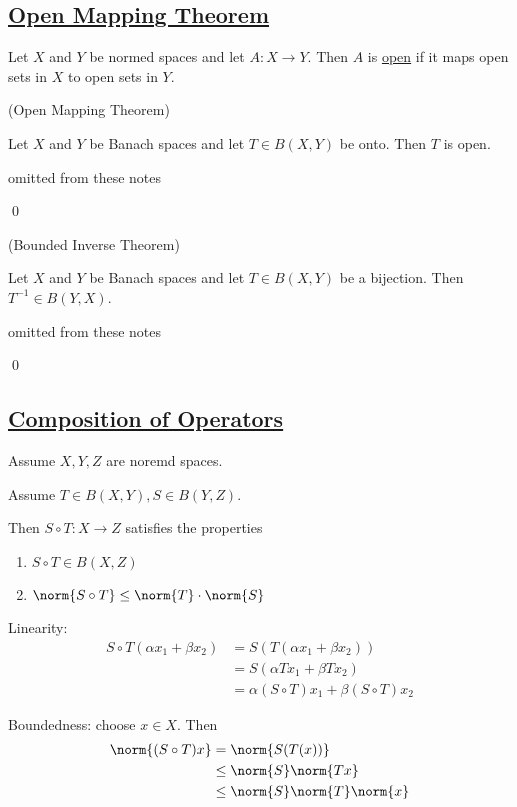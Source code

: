 \documentclass[x11names,reqno,14pt]{extarticle}
\begin{document}
\subsection*{\underline{Open Mapping Theorem}}


Let $X$ and $Y$ be normed spaces and let $A:X\to Y$. Then $A$ is \underline{open} if it maps open sets in $X$ to open sets in $Y$. 

\thm (Open Mapping Theorem)

Let $X$ and $Y$ be Banach spaces and let $T \in B(X, Y)$ be onto. Then $T$ is open. 

\proof 

omitted from these notes

\qed

\thm (Bounded Inverse Theorem)

Let $X$ and $Y$ be Banach spaces and let $T \in B(X, Y)$ be a bijection. Then $T^{-1}\in B(Y, X)$. 

\proof

omitted from these notes

\qed

\subsection*{\underline{Composition of Operators}}

Assume $X, Y, Z$ are noremd spaces. 

Assume $T \in B(X, Y), S \in B(Y, Z)$. 

Then $S \circ T:X\to Z$ satisfies the properties
\begin{enumerate}

\item $S \circ T \in B(X, Z)$

\item $\norm{S \circ T} \leq \norm{T}\cdot\norm{S}$

\end{enumerate}

Linearity: 
\begin{align*}
S\circ T(\alpha x_1 + \beta x_2) & = S(T(\alpha x_1 + \beta x_2)) \\
& = S(\alpha Tx_1 + \beta Tx_2) \\
& = \alpha(S\circ T)x_1 + \beta(S \circ T)x_2
\end{align*}

Boundedness: choose $x \in X$. Then
\begin{align*}
\norm{(S\circ T)x} & = \norm{S(T(x))} \\
& \leq \norm{S}\norm{Tx} \\
& \leq \norm{S}\norm{T}\norm{x} \\
\end{align*}
\end{document}
